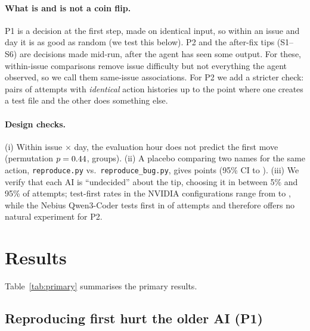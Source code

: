\documentclass[sigconf,review=false,anonymous=false]{acmart}
\begin{document}
\paragraph{What is and is not a coin flip.} P1 is a decision at the first step, made on identical input, so within an issue and day it is as good as random (we test this below). P2 and the after-fix tips (S1--S6) are decisions made mid-run, after the agent has seen some output. For these, within-issue comparisons remove issue difficulty but not everything the agent observed, so we call them same-issue associations. For P2 we add a stricter check: pairs of attempts with \emph{identical} action histories up to the point where one creates a test file and the other does something else.

\paragraph{Design checks.} (i) Within issue $\times$ day, the evaluation hour does not predict the first move (permutation $p=0.44$, \HourBalanceGroups{} groups). (ii) A placebo comparing two names for the same action, \texttt{reproduce.py} vs.\ \texttt{reproduce\_bug.py}, gives \Placebo{} points (95\% CI \PlaceboLo{} to \PlaceboHi{}). (iii) We verify that each AI is ``undecided'' about the tip, choosing it in between 5\% and 95\% of attempts; test-first rates in the NVIDIA configurations range from \ComplianceMin{} to \ComplianceMax{}, while the Nebius Qwen3-Coder tests first in \NebiusCompliance{} of attempts and therefore offers no natural experiment for P2.

\section{Results}

Table~\ref{tab:primary} summarises the primary results.

\begin{table}[t]
  \caption{Primary estimates, in bugs fixed per 100 attempts (95\% CI). Groups / issues / attempts refer to the fair comparison.}
  \label{tab:primary}
  \footnotesize
  \resizebox{\textwidth}{!}{}
\end{table}

\subsection{Reproducing first hurt the older AI (P1)}
\end{document}
